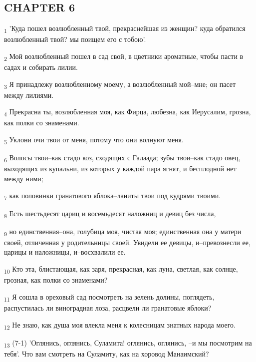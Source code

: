 \subsection{CHAPTER 6}
\begin{tcolorbox}
\textsubscript{1} 'Куда пошел возлюбленный твой, прекраснейшая из женщин? куда обратился возлюбленный твой? мы поищем его с тобою'.
\end{tcolorbox}
\begin{tcolorbox}
\textsubscript{2} Мой возлюбленный пошел в сад свой, в цветники ароматные, чтобы пасти в садах и собирать лилии.
\end{tcolorbox}
\begin{tcolorbox}
\textsubscript{3} Я принадлежу возлюбленному моему, а возлюбленный мой--мне; он пасет между лилиями.
\end{tcolorbox}
\begin{tcolorbox}
\textsubscript{4} Прекрасна ты, возлюбленная моя, как Фирца, любезна, как Иерусалим, грозна, как полки со знаменами.
\end{tcolorbox}
\begin{tcolorbox}
\textsubscript{5} Уклони очи твои от меня, потому что они волнуют меня.
\end{tcolorbox}
\begin{tcolorbox}
\textsubscript{6} Волосы твои--как стадо коз, сходящих с Галаада; зубы твои--как стадо овец, выходящих из купальни, из которых у каждой пара ягнят, и бесплодной нет между ними;
\end{tcolorbox}
\begin{tcolorbox}
\textsubscript{7} как половинки гранатового яблока--ланиты твои под кудрями твоими.
\end{tcolorbox}
\begin{tcolorbox}
\textsubscript{8} Есть шестьдесят цариц и восемьдесят наложниц и девиц без числа,
\end{tcolorbox}
\begin{tcolorbox}
\textsubscript{9} но единственная--она, голубица моя, чистая моя; единственная она у матери своей, отличенная у родительницы своей. Увидели ее девицы, и--превознесли ее, царицы и наложницы, и--восхвалили ее.
\end{tcolorbox}
\begin{tcolorbox}
\textsubscript{10} Кто эта, блистающая, как заря, прекрасная, как луна, светлая, как солнце, грозная, как полки со знаменами?
\end{tcolorbox}
\begin{tcolorbox}
\textsubscript{11} Я сошла в ореховый сад посмотреть на зелень долины, поглядеть, распустилась ли виноградная лоза, расцвели ли гранатовые яблоки?
\end{tcolorbox}
\begin{tcolorbox}
\textsubscript{12} Не знаю, как душа моя влекла меня к колесницам знатных народа моего.
\end{tcolorbox}
\begin{tcolorbox}
\textsubscript{13} (7-1) 'Оглянись, оглянись, Суламита! оглянись, оглянись, --и мы посмотрим на тебя'. Что вам смотреть на Суламиту, как на хоровод Манаимский?
\end{tcolorbox}
